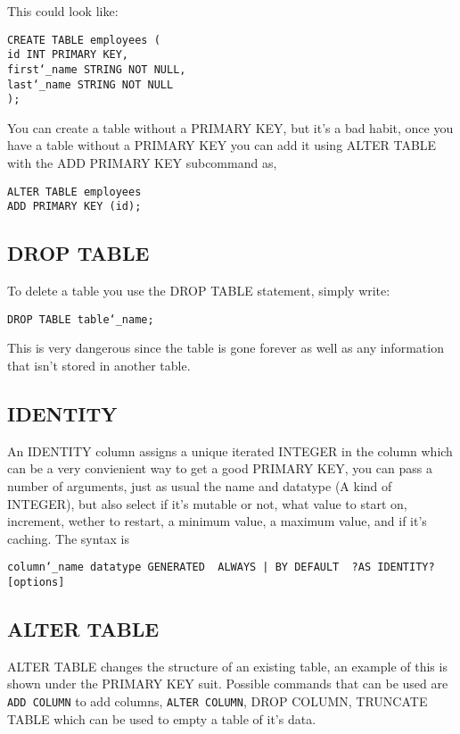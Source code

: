 \documentclass[10pt, english]{article}
\begin{document}
This could look like:

\texttt{CREATE TABLE employees ( \\
\hspace*{10pt} id INT PRIMARY KEY, \\
\hspace*{10pt} first\char`_name STRING NOT NULL, \\
\hspace*{10pt} last\char`_name STRING NOT NULL \\
);
}

You can create a table without a PRIMARY KEY, but it's a bad habit, once you have a table without a PRIMARY KEY you can
add it using ALTER TABLE with the ADD PRIMARY KEY subcommand as,

\texttt{ALTER TABLE employees \\
ADD PRIMARY KEY (id);
}

\subsection{DROP TABLE}
To delete a table you use the DROP TABLE statement, simply write:

\texttt{DROP TABLE table\char`_name;}

This is very dangerous since the table is gone forever as well as any information that isn't stored in another table.

\subsection{IDENTITY}
An IDENTITY column assigns a unique iterated INTEGER in the column which can be a very convienient way to get a good PRIMARY KEY, you can pass a number of arguments, 
just as usual the name and datatype (A kind of INTEGER), but also select if it's mutable or not, what value to start on, increment, wether to restart, a minimum value, a maximum value, and 
if it's caching. The syntax is 

\texttt{column\char`_name datatype GENERATED { ALWAYS | BY DEFAULT } ?AS IDENTITY? [options]}

\subsection{ALTER TABLE}
ALTER TABLE changes the structure of an existing table, an example of this is shown under 
the PRIMARY KEY suit. Possible commands that can be used are \texttt{ADD COLUMN} to add columns, \texttt{ALTER COLUMN}, DROP COLUMN, 
TRUNCATE TABLE which can be used to empty a table of it's data.
\end{document}
